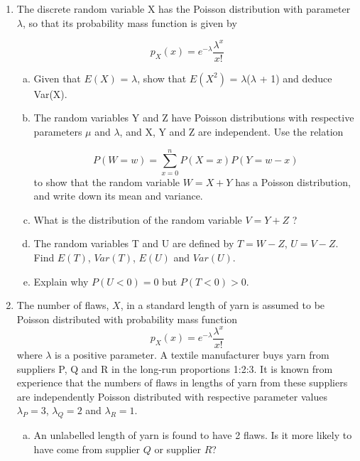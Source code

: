 \documentclass[a4paper,12pt]{article}
\begin{document}
\begin{enumerate}
\begin{enumerate}[(i)]
\end{enumerate}

\item The discrete random variable X has the Poisson distribution with parameter $\lambda$, so that
its probability mass function is given by

\[ {\displaystyle  p_X(x) = e^{-\lambda }{\frac {\lambda ^{x}}{x!}}}  \]

\begin{enumerate}[(a)]
\item Given that $E(X)$ = $\lambda$, show that $E(X^2)$ = $\lambda$($\lambda$ + 1) and deduce Var(X).

\item The random variables Y and Z have Poisson distributions with respective
parameters $\mu$ and $\lambda$, and X, Y and Z are independent. Use the relation

\[ P(W=w) =  \sum^{n}_{x=0} P(X=x) P(Y=w-x) \]
to show that the random variable $W = X + Y$ has a Poisson distribution, and
write down its mean and variance. 
\item What is the distribution of the random
variable $V = Y + Z$ ?

\item  The random variables T and U are defined by $T = W - Z$, $U = V - Z$. Find
$E(T)$, $Var(T)$, $E(U)$ and $Var(U)$. 
\item Explain why $P(U < 0) = 0$ but $P(T < 0) > 0$.
\end{enumerate}



\item The number of flaws, $X$, in a standard length of yarn is assumed to be Poisson distributed with probability mass function
\[ {\displaystyle  p_X(x) = e^{-\lambda }{\frac {\lambda ^{x}}{x!}}}  \]
where $\lambda$ is a positive parameter. A textile manufacturer buys yarn from suppliers P, Q and R in the long-run proportions 1:2:3. It is known from experience that the numbers of flaws in lengths of yarn from these suppliers are independently Poisson distributed with respective parameter values $\lambda_P=3$,
$\lambda_Q=2$ and $\lambda_R=1$.

\begin{enumerate}[(a)]
\item An unlabelled length of yarn is found to have 2 flaws. Is it more likely to have come from supplier $Q$ or supplier $R$?


\end{enumerate}
\end{enumerate}
\end{document}
